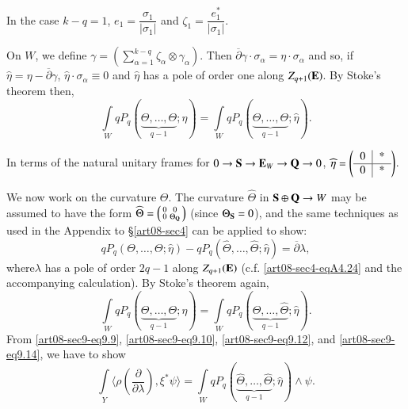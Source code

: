 \begin{remark*}
In the case $k-q=1$, $e_{1}=\dfrac{\sigma_{1}}{|\sigma_{1}|}$ and $\zeta_{1}=\dfrac{e^{*}_{1}}{|\sigma_{1}|}$.
\end{remark*}

On $W$, we define $\gamma=\left(\sum\limits^{k-q}_{\alpha=1}\zeta_{\alpha}\otimes \gamma_{\alpha}\right)$. Then $\overline{\partial}\gamma\cdot \sigma_{\alpha}=\eta\cdot \sigma_{\alpha}$ and so, if $\widehat{\eta}=\eta-\overline{\partial}\gamma$, $\widehat{\eta}\cdot \sigma_{\alpha}\equiv 0$ and $\widehat{\eta}$ has a pole of order one along $Z_{q+1}(\mathbf{E})$. By Stoke's theorem then,
\begin{equation}
\int\limits_{W}qP_{q}(\underbrace{\Theta,\ldots,\Theta}_{q-1};\eta)=\int\limits_{W}qP_{q}(\underbrace{\Theta,\ldots,\Theta}_{q-1};\widehat{\eta}).\label{art08-sec9-eq9.12}
\end{equation}

In terms of the natural unitary frames for $0\to \mathbf{S}\to \mathbf{E}_{W}\to \mathbf{Q}\to 0$, $\widehat{\eta}=\left(\begin{tabular}{c|c} 0 & *\\\hline 0 & *\end{tabular}\right)$.

We now work on the curvature $\Theta$. The curvature $\widehat{\Theta}$ in $\mathbf{S}\oplus \mathbf{Q}\to W$ may be assumed to have the form $\widehat{\Theta}=\left(\begin{smallmatrix} 0 & 0\\ 0 & \Theta_{\mathbf{Q}}\end{smallmatrix}\right)$ (since $\Theta_{\mathbf{S}}=0$), and the same techniques as used in the Appendix to \S\ref{art08-sec4} can be applied to show:
\begin{equation}
qP_{q}(\Theta,\ldots,\Theta;\widehat{\eta})-qP_{q}(\widehat{\Theta},\ldots,\widehat{\Theta};\widehat{\eta})=\overline{\partial}\lambda,\label{art08-sec9-eq9.13}
\end{equation}
where\pageoriginale $\lambda$ has a pole of order $2q-1$ along $Z_{q+1}(\mathbf{E})$ (c.f. \eqref{art08-sec4-eqA4.24} and the accompanying calculation). By Stoke's theorem again,
\begin{equation}
\int\limits_{W}qP_{q}(\underbrace{\Theta,\ldots,\Theta}_{q-1};\widehat{\eta})=\int\limits_{W}qP_{q}(\underbrace{\widehat{\Theta},\ldots,\widehat{\Theta}}_{q-1};\widehat{\eta}).\label{art08-sec9-eq9.14}
\end{equation}
From \eqref{art08-sec9-eq9.9}, \eqref{art08-sec9-eq9.10}, \eqref{art08-sec9-eq9.12}, and \eqref{art08-sec9-eq9.14}, we have to show
\begin{equation}
\int\limits_{Y}\langle \rho\left(\frac{\partial}{\partial\lambda}\right), \xi^{*}\psi\rangle =\int\limits_{W}qP_{q}(\underbrace{\widehat{\Theta},\ldots,\widehat{\Theta}}_{q-1};\widehat{\eta})\wedge \psi.\label{art08-sec9-eq9.15}
\end{equation}


